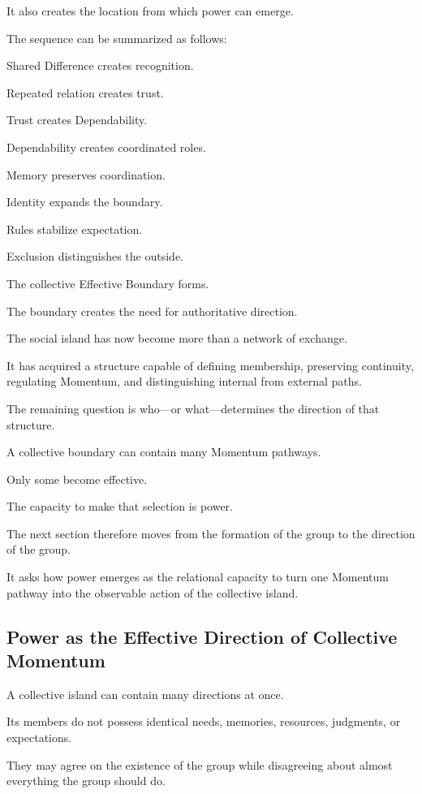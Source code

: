 It also creates the location from which power can emerge.

The sequence can be summarized as follows:

Shared Difference creates recognition.

Repeated relation creates trust.

Trust creates Dependability.

Dependability creates coordinated roles.

Memory preserves coordination.

Identity expands the boundary.

Rules stabilize expectation.

Exclusion distinguishes the outside.

The collective Effective Boundary forms.

The boundary creates the need for authoritative direction.

The social island has now become more than a network of exchange.

It has acquired a structure capable of defining membership, preserving continuity, regulating Momentum, and distinguishing internal from external paths.

The remaining question is who—or what—determines the direction of that structure.

A collective boundary can contain many Momentum pathways.

Only some become effective.

The capacity to make that selection is power.

The next section therefore moves from the formation of the group to the direction of the group.

It asks how power emerges as the relational capacity to turn one Momentum pathway into the observable action of the collective island.


\subsection*{\textbf{Power as the Effective Direction of Collective Momentum}}


A collective island can contain many directions at once.

Its members do not possess identical needs, memories, resources, judgments, or expectations.

They may agree on the existence of the group while disagreeing about almost everything the group should do.

